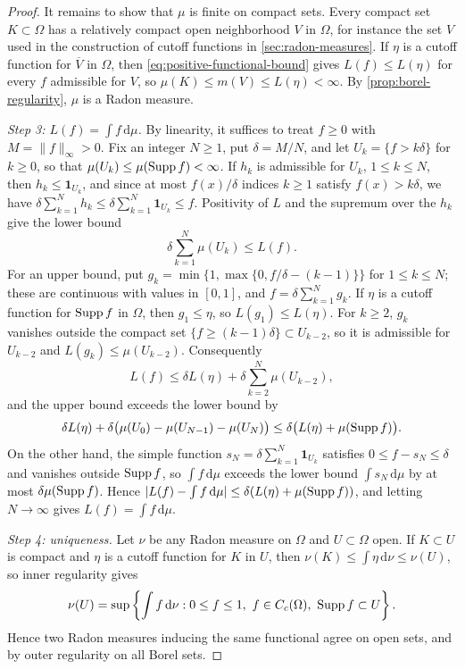 \begin{proof}
It remains to show that $\mu$ is finite on compact sets. Every compact set $K\subset\Omega$ has a relatively compact open neighborhood $V$ in $\Omega$, for instance the set $V$ used in the construction of cutoff functions in \cref{sec:radon-measures}. If $\eta$ is a cutoff function for $\overline V$ in $\Omega$, then \eqref{eq:positive-functional-bound} gives $L(f)\leq L(\eta)$ for every $f$ admissible for $V$, so $\mu(K)\leq m(V)\leq L(\eta)<\infty$. By \cref{prop:borel-regularity}, $\mu$ is a Radon measure.

\emph{Step 3: $L(f)=\int f\,\mathrm d\mu$.} By linearity, it suffices to treat $f\geq0$ with $M=\|f\|_\infty>0$. Fix an integer $N\geq1$, put $\delta=M/N$, and let $U_k=\{f>k\delta\}$ for $k\geq0$, so that $\mu(U_k)\leq\mu(\operatorname{Supp} f)<\infty$. If $h_k$ is admissible for $U_k$, $1\leq k\leq N$, then $h_k\leq\mathbf1_{U_k}$, and since at most $f(x)/\delta$ indices $k\geq1$ satisfy $f(x)>k\delta$, we have $\delta\sum_{k=1}^Nh_k\leq\delta\sum_{k=1}^N\mathbf1_{U_k}\leq f$. Positivity of $L$ and the supremum over the $h_k$ give the lower bound
\[
 \delta\sum_{k=1}^N\mu(U_k)\leq L(f).
\]
For an upper bound, put $g_k=\min\{1,\max\{0,f/\delta-(k-1)\}\}$ for $1\leq k\leq N$; these are continuous with values in $[0,1]$, and $f=\delta\sum_{k=1}^Ng_k$. If $\eta$ is a cutoff function for $\operatorname{Supp} f$ in $\Omega$, then $g_1\leq\eta$, so $L(g_1)\leq L(\eta)$. For $k\geq2$, $g_k$ vanishes outside the compact set $\{f\geq(k-1)\delta\}\subset U_{k-2}$, so it is admissible for $U_{k-2}$ and $L(g_k)\leq\mu(U_{k-2})$. Consequently
\[
 L(f)\leq\delta L(\eta)+\delta\sum_{k=2}^N\mu(U_{k-2}),
\]
and the upper bound exceeds the lower bound by
\[
 \delta L(\eta)+\delta\bigl(\mu(U_0)-\mu(U_{N-1})-\mu(U_N)\bigr)\leq\delta\bigl(L(\eta)+\mu(\operatorname{Supp} f)\bigr).
\]
On the other hand, the simple function $s_N=\delta\sum_{k=1}^N\mathbf1_{U_k}$ satisfies $0\leq f-s_N\leq\delta$ and vanishes outside $\operatorname{Supp} f$, so $\int f\,\mathrm d\mu$ exceeds the lower bound $\int s_N\,\mathrm d\mu$ by at most $\delta\mu(\operatorname{Supp} f)$. Hence $|L(f)-\int f\,\mathrm d\mu|\leq\delta(L(\eta)+\mu(\operatorname{Supp} f))$, and letting $N\to\infty$ gives $L(f)=\int f\,\mathrm d\mu$.

\emph{Step 4: uniqueness.} Let $\nu$ be any Radon measure on $\Omega$ and $U\subset\Omega$ open. If $K\subset U$ is compact and $\eta$ is a cutoff function for $K$ in $U$, then $\nu(K)\leq\int\eta\,\mathrm d\nu\leq\nu(U)$, so inner regularity gives
\begin{equation}\label{eq:measure-open-tests}
 \nu(U)=\sup\left\{\int f\,\mathrm d\nu:0\leq f\leq1,\ f\in C_c(\Omega),\ \Supp f\subset U\right\}.
\end{equation}
Hence two Radon measures inducing the same functional agree on open sets, and by outer regularity on all Borel sets.
\end{proof}


